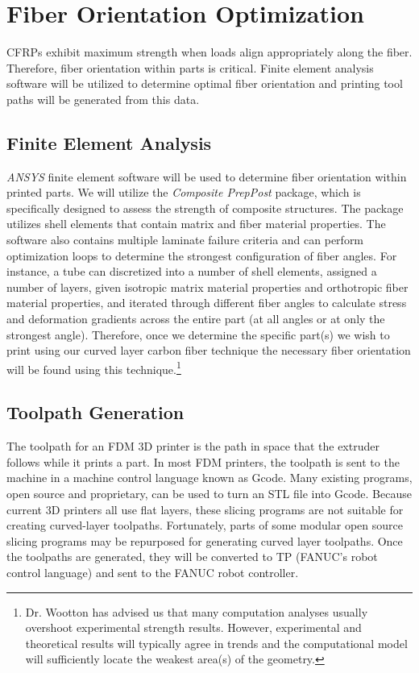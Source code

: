 \section{Fiber Orientation Optimization}

\indent

CFRPs exhibit maximum strength when loads align appropriately along the fiber. Therefore, fiber orientation within parts is critical. Finite element analysis software will be utilized to determine optimal fiber orientation and printing tool paths will be generated from this data.

\subsection{Finite Element Analysis}

\indent

\emph{ANSYS} finite element software will be used to determine fiber orientation within printed parts. We will utilize the \emph{Composite PrepPost} package, which is specifically designed to assess the strength of composite structures. The package utilizes shell elements that contain matrix and fiber material properties. The software also contains multiple laminate failure criteria and can perform optimization loops to determine the strongest configuration of fiber angles. For instance, a tube can discretized into a number of shell elements, assigned a number of layers, given isotropic matrix material properties and orthotropic fiber material properties, and iterated through different fiber angles to calculate stress and deformation gradients across the entire part (at all angles or at only the strongest angle). Therefore, once we determine the specific part(s) we wish to print using our curved layer carbon fiber technique the necessary fiber orientation will be found using this technique.\footnote{Dr. Wootton has advised us that many computation analyses usually overshoot experimental strength results. However, experimental and theoretical results will typically agree in trends and the computational model will sufficiently locate the weakest area(s) of the geometry.}\\

\subsection{Toolpath Generation}

\indent

The toolpath for an FDM 3D printer is the path in space that the extruder follows while it prints a part. In most FDM printers, the toolpath is sent to the machine in a machine control language known as Gcode. Many existing programs, open source and proprietary, can be used to turn an STL file into Gcode. Because current 3D printers all use flat layers, these slicing programs are not suitable for creating curved-layer toolpaths. Fortunately, parts of some modular open source slicing programs may be repurposed for generating curved layer toolpaths. Once the toolpaths are generated, they will be converted to TP (FANUC's robot control language) and sent to the FANUC robot controller. 
